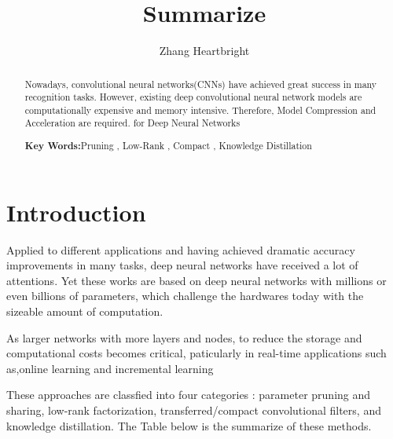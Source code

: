 \documentclass[a4paper]{article}
\title{Summarize}
\author{Zhang Heartbright}
\begin{document}
	
	\maketitle
	
	\begin{abstract}
		Nowadays, convolutional neural networks(CNNs) have achieved great success in many recognition tasks. However, existing deep convolutional neural network models are computationally expensive and memory intensive. Therefore, Model Compression and Acceleration are required. 
		for Deep Neural Networks
		\par{\bfseries Key Words:}Pruning , Low-Rank , Compact , Knowledge Distillation
	\end{abstract}
	
	\section{Introduction}	
	  Applied to  different applications and having achieved dramatic accuracy improvements in many tasks, deep neural networks have received a lot of attentions. Yet these works are based on deep neural networks with millions or even billions of parameters, which challenge the hardwares today with the  sizeable amount of computation.\par 
	As larger networks with more layers and nodes, to reduce the storage and computational costs becomes critical, paticularly in real-time applications such as,online learning and incremental learning
	\par 
	These approaches are classfied into four categories : parameter
	pruning and sharing, low-rank factorization, transferred/compact
	convolutional filters, and knowledge distillation. The Table below is the summarize of these methods.
\end{document}
